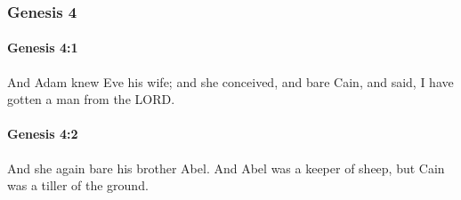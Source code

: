 	\subsubsection{Genesis 4} %
		\label{GENESIS-4}

		\paragraph{Genesis 4:1} %
			\label{GENESIS-4-1}

			And Adam knew Eve his wife; and she conceived, and bare Cain, and said, I have gotten a man from the LORD.


		\paragraph{Genesis 4:2} %
			\label{GENESIS-4-2}

			And she again bare his brother Abel. And Abel was a keeper of sheep, but Cain was a tiller of the ground.

